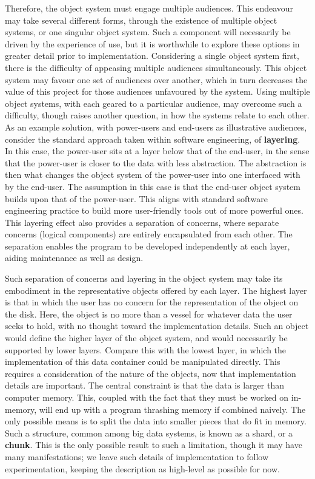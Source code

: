 Therefore, the object system must engage multiple audiences.
This endeavour may take several different forms, through the existence of multiple object systems, or one singular object system.
Such a component will necessarily be driven by the experience of use, but it is worthwhile to explore these options in greater detail prior to implementation.
Considering a single object system first, there is the difficulty of appeasing multiple audiences simultaneously.
This object system may favour one set of audiences over another, which in turn decreases the value of this project for those audiences unfavoured by the system.
Using multiple object systems, with each geared to a particular audience, may overcome such a difficulty, though raises another question, in how the systems relate to each other.
As an example solution, with power-users and end-users as illustrative audiences, consider the standard approach taken within software engineering, of \textbf{layering}.
In this case, the power-user sits at a layer below that of the end-user, in the sense that the power-user is closer to the data with less abstraction.
The abstraction is then what changes the object system of the power-user into one interfaced with by the end-user.
The assumption in this case is that the end-user object system builds upon that of the power-user.
This aligns with standard software engineering practice to build more user-friendly tools out of more powerful ones\cite{raymond2003}.
This layering effect also provides a separation of concerns, where separate concerns (logical components) are entirely encapsulated from each other.
The separation enables the program to be developed independently at each layer, aiding maintenance as well as design.

Such separation of concerns and layering in the object system may take its embodiment in the representative objects offered by each layer.
The highest layer is that in which the user has no concern for the representation of the object on the disk.
Here, the object is no more than a vessel for whatever data the user seeks to hold, with no thought toward the implementation details.
Such an object would define the higher layer of the object system, and would necessarily be supported by lower layers.
Compare this with the lowest layer, in which the implementation of this data container could be manipulated directly.
This requires a consideration of the nature of the objects, now that implementation details are important.
The central constraint is that the data is larger than computer memory.
This, coupled with the fact that they must be worked on in-memory, will end up with a program thrashing memory if combined naively.
The only possible means is to split the data into smaller pieces that do fit in memory.
Such a structure, common among big data systems, is known as a shard, or a \textbf{chunk}.
This is the only possible result to such a limitation, though it may have many manifestations; we leave such details of implementation to follow experimentation, keeping the description as high-level as possible for now.

